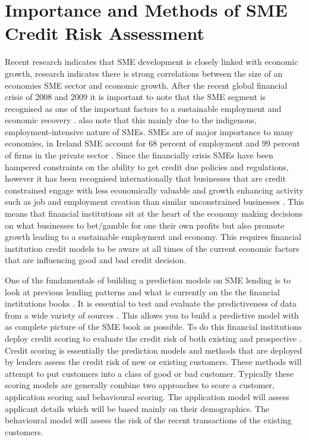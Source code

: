 \section{Importance and Methods of SME Credit Risk Assessment}
Recent research indicates that SME development is closely linked with economic growth, \cite{beck_smes_2005} research indicates there is strong correlations between the size of an economies SME sector and economic growth. After the recent global financial crisis of 2008 and 2009 it is important to note that the SME segment is recognised as one of the important factors to a sustainable employment and economic recovery \citep{lawless_smes_2012}. \cite{lawless_smes_2012} also note that this mainly due to the indigenous, employment-intensive nature of SMEs. SMEs are of major importance to many economies, in Ireland SME account for 68 percent of employment and 99 percent of firms in the private sector \cite{lawless_irish_2012}. Since the financially crisis SMEs have been hampered constraints on the ability to get credit due policies and regulations, however it has been recognised internationally that businesses that are credit constrained engage with less economically valuable and growth enhancing activity such as job and employment creation than similar unconstrained businesses \citep{campello_real_2010}. This means that financial institutions sit at the heart of the economy making decisions on what businesses to bet/gamble for one their own profits but also promote growth leading to a sustainable employment and economy. This requires financial institution credit models to be aware at all times of the current economic factors that are influencing good and bad credit decision. 

One of the fundamentals of building a prediction models on SME lending is to look at previous lending patterns and what is currently on the the financial institutions books \citep{lawless_irish_2012}. It is essential to test and evaluate the predictiveness of data from a wide variety of sources \citep{lawless_smes_2012}. This allows you to build a predictive model with as complete picture of the SME book as possible. To do this financial institutions deploy credit scoring to evaluate the credit risk of both existing and prospective \citep{kennedy_credit_2013}. Credit scoring is essentially the prediction models and methods that are deployed by lenders assess the credit risk of new or existing customers. These methods will attempt to put customers into a class of good or bad customer. Typically these scoring models are generally combine two approaches to score a customer, application scoring and behavioural scoring. The application model will assess applicant details which will be based mainly on their demographics. The behavioural model will assess the risk of the recent transactions of the existing customers. 

